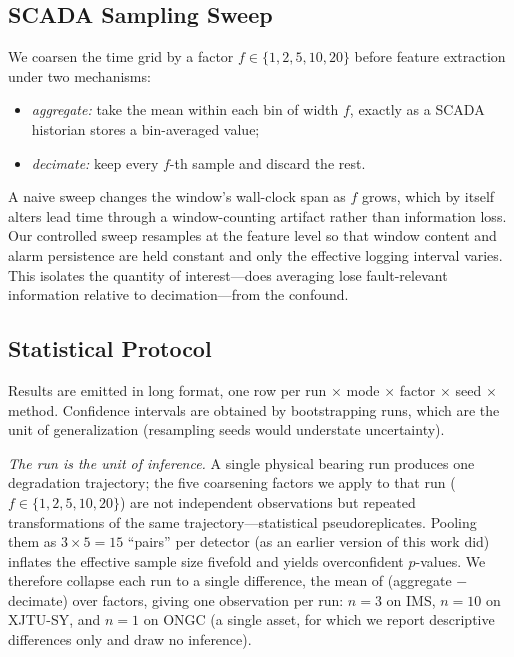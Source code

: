 \documentclass[IJPHM, 2026, 0]{PHMSociety}
\begin{document}
\subsection{SCADA Sampling Sweep}
We coarsen the time grid by a factor $f \in \{1, 2, 5, 10, 20\}$ before feature extraction under two mechanisms:
\begin{itemize}
\item \emph{aggregate:} take the mean within each bin of width $f$, exactly as a SCADA historian stores a bin-averaged value;
\item \emph{decimate:} keep every $f$-th sample and discard the rest.
\end{itemize}
A naive sweep changes the window's wall-clock span as $f$ grows, which by itself alters lead time through a window-counting artifact rather than information loss. Our controlled sweep resamples at the feature level so that window content and alarm persistence are held constant and only the effective logging interval varies. This isolates the quantity of interest---does averaging lose fault-relevant information relative to decimation---from the confound.

\subsection{Statistical Protocol}
\label{sec:statproto}
Results are emitted in long format, one row per run $\times$ mode $\times$ factor $\times$ seed $\times$ method. Confidence intervals are obtained by bootstrapping runs, which are the unit of generalization (resampling seeds would understate uncertainty).

\emph{The run is the unit of inference.} A single physical bearing run produces one degradation trajectory; the five coarsening factors we apply to that run ($f \in \{1, 2, 5, 10, 20\}$) are not independent observations but repeated transformations of the same trajectory---statistical pseudoreplicates. Pooling them as $3 \times 5 = 15$ ``pairs'' per detector (as an earlier version of this work did) inflates the effective sample size fivefold and yields overconfident $p$-values. We therefore collapse each run to a single difference, the mean of (aggregate $-$ decimate) over factors, giving one observation per run: $n=3$ on IMS, $n=10$ on XJTU-SY, and $n=1$ on ONGC (a single asset, for which we report descriptive differences only and draw no inference).
\end{document}
